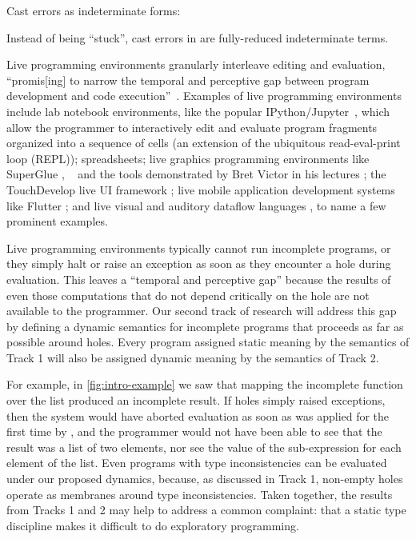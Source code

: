 Cast errors as indeterminate forms:

Instead of being ``stuck'', cast errors in \HazelnutLive are
fully-reduced indeterminate terms.




Live programming environments granularly interleave editing and evaluation,
``promis[ing] to narrow the temporal and perceptive gap 
between program development and code execution''~\cite{burckhardt2013s}.
Examples of live programming environments include {lab notebook environments},
like the popular IPython/Jupyter~\cite{PER-GRA:2007}, which allow the
programmer to interactively edit and evaluate program fragments organized into a
sequence of cells (an extension of the ubiquitous read-eval-print loop (REPL)); spreadsheets; {live graphics programming environments} like SuperGlue \cite{McDirmid:2007}, \sns{}~\cite{sns-pldi,sns-uist} and the tools demonstrated by Bret Victor in his lectures \cite{victor2012inventing}; the TouchDevelop live UI framework \cite{burckhardt2013s}; live mobile application development systems like Flutter \cite{flutter}; and live visual and auditory dataflow languages \cite{DBLP:conf/vl/BurnettAW98}, to name a few prominent examples. 


Live programming environments typically cannot run incomplete programs, or they simply halt or raise an exception as soon as they encounter a hole during evaluation. This leaves a ``temporal and perceptive gap'' because the results of even those computations that do not depend critically on the hole are not available to the programmer. Our second track of research will address this gap by defining a dynamic semantics for incomplete programs that proceeds as far as possible around holes. 
Every program assigned static meaning by the semantics of Track 1 will also be assigned dynamic meaning by the semantics of Track 2.

For example, in \autoref{fig:intro-example} we saw that mapping the incomplete function  over the  list produced an incomplete result. If holes simply raised exceptions, then the system would have aborted evaluation as soon as  was applied for the first time by , and the programmer would not have been able to see that the result was a list of two elements, nor see the value of the sub-expression  for each element  of the  list. Even programs with type inconsistencies can be evaluated under our proposed dynamics, because, as discussed in Track 1, non-empty holes operate as membranes around type inconsistencies. Taken together, the results from Tracks 1 and 2 may help to address a common complaint: that a static type discipline makes it difficult to do exploratory programming. 

